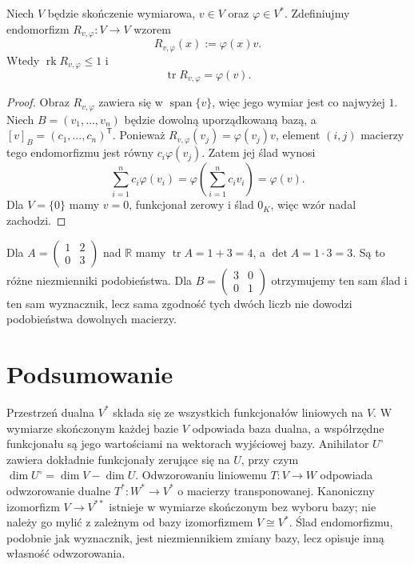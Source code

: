 \begin{stwierdzenie}
\label{prop:lin7-slad-rank-jeden}
Niech \(V\) będzie skończenie wymiarowa,
\(v\in V\) oraz \(\varphi\in V^*\).
Zdefiniujmy endomorfizm
\(R_{v,\varphi}\colon V\to V\) wzorem
\[
 R_{v,\varphi}(x):=\varphi(x)v.
\]
Wtedy \(\operatorname{rk}R_{v,\varphi}\leq1\)
i
\[
 \operatorname{tr}R_{v,\varphi}=\varphi(v).
\]
\end{stwierdzenie}
\begin{proof}
Obraz \(R_{v,\varphi}\)
zawiera się w \(\operatorname{span}\{v\}\),
więc jego wymiar jest co najwyżej \(1\).
Niech \(B=(v_1,\ldots,v_n)\)
będzie dowolną uporządkowaną bazą,
a \([v]_B=(c_1,\ldots,c_n)^{\mathsf T}\).
Ponieważ
\(R_{v,\varphi}(v_j)=\varphi(v_j)v\),
element \((i,j)\) macierzy
tego endomorfizmu jest równy
\(c_i\varphi(v_j)\).
Zatem jej ślad wynosi
\[
 \sum_{i=1}^n c_i\varphi(v_i)
 =\varphi\left(\sum_{i=1}^n c_iv_i\right)
 =\varphi(v).
\]
Dla \(V=\{0\}\) mamy \(v=0\),
funkcjonał zerowy i ślad \(0_K\),
więc wzór nadal zachodzi.
\end{proof}

\begin{przyklad}
\label{prz:lin7-slad-wyznacznik}
Dla \(A=\begin{pmatrix}1&2\\0&3\end{pmatrix}\)
nad \(\mathbb R\) mamy
\(\operatorname{tr}A=1+3=4\),
a \(\det A=1\cdot3=3\).
Są to różne niezmienniki
podobieństwa. Dla
\(B=\begin{pmatrix}3&0\\0&1\end{pmatrix}\)
otrzymujemy ten sam ślad i
ten sam wyznacznik, lecz sama zgodność
tych dwóch liczb nie dowodzi podobieństwa
dowolnych macierzy.
\end{przyklad}

\section{Podsumowanie}
\label{sec:lin7-podsumowanie}

Przestrzeń dualna \(V^*\)
składa się ze wszystkich funkcjonałów
liniowych na \(V\). W wymiarze
skończonym każdej bazie \(V\)
odpowiada baza dualna, a współrzędne
funkcjonału są jego wartościami
na wektorach wyjściowej bazy.
Anihilator \(U^\circ\)
zawiera dokładnie funkcjonały
zerujące się na \(U\), przy czym
\(\dim U^\circ=\dim V-\dim U\).
Odwzorowaniu liniowemu \(T\colon V\to W\)
odpowiada odwzorowanie dualne
\(T^*\colon W^*\to V^*\)
o macierzy transponowanej.
Kanoniczny izomorfizm
\(V\to V^{**}\) istnieje
w wymiarze skończonym bez wyboru bazy;
nie należy go mylić z zależnym
od bazy izomorfizmem \(V\cong V^*\).
Ślad endomorfizmu, podobnie jak
wyznacznik, jest niezmiennikiem
zmiany bazy, lecz opisuje inną
własność odwzorowania.
